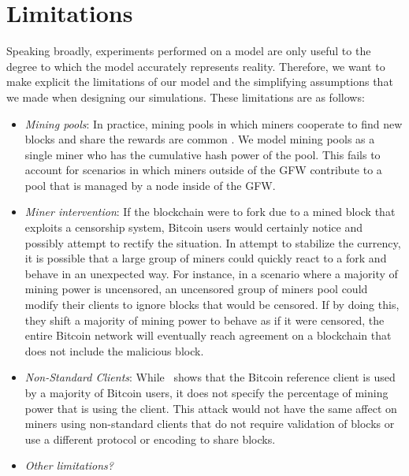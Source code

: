 \section{Limitations}
Speaking broadly, experiments performed on a model are only useful to the degree to which the model accurately represents reality.
Therefore, we want to make explicit the limitations of our model and the simplifying assumptions that we made when designing our simulations. These limitations are as follows:

\begin{itemize}
	\item \textit{Mining pools}: In practice, mining pools in which miners cooperate to find new blocks and share the rewards are common \cite{Rosenfeld}. We model mining pools as a single miner who has the cumulative hash power of the pool. This fails to account for scenarios in which miners outside of the GFW contribute to a pool that is managed by a node inside of the GFW.
	\item \textit{Miner intervention}: If the blockchain were to fork due to a mined block that exploits a censorship system, Bitcoin users would certainly notice and possibly attempt to rectify the situation.
In attempt to stabilize the currency, it is possible that a large group of miners could quickly react to a fork and behave in an unexpected way. For instance, in a scenario where a majority of mining power is uncensored, an uncensored group of miners pool could modify their clients to ignore blocks that would be censored. If by doing this, they shift a majority of mining power to behave as if it were censored, the entire Bitcoin network will eventually reach agreement on a blockchain that does not include the malicious block.
	\item \textit{Non-Standard Clients}: While~\cite{shadow-bitcoin} shows that the Bitcoin reference client is used by a majority of Bitcoin users, it does not specify the percentage of mining power that is using the client. This attack would not have the same affect on miners using non-standard clients that do not require validation of blocks or use a different protocol or encoding to share blocks.

	\item \textit{Other limitations?} %
\end{itemize}


